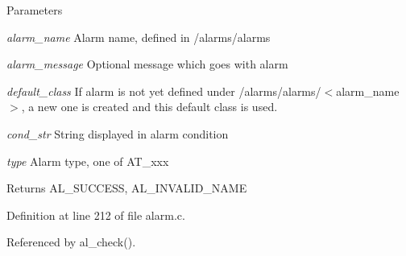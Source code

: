 \begin{DoxyParams}{Parameters}
\item[{\em alarm\_\-name}]Alarm name, defined in /alarms/alarms \item[{\em alarm\_\-message}]Optional message which goes with alarm \item[{\em default\_\-class}]If alarm is not yet defined under /alarms/alarms/$<$alarm\_\-name$>$, a new one is created and this default class is used. \item[{\em cond\_\-str}]String displayed in alarm condition \item[{\em type}]Alarm type, one of AT\_\-xxx \end{DoxyParams}
\begin{DoxyReturn}{Returns}
AL\_\-SUCCESS, AL\_\-INVALID\_\-NAME 
\end{DoxyReturn}


Definition at line 212 of file alarm.c.

Referenced by al\_\-check().